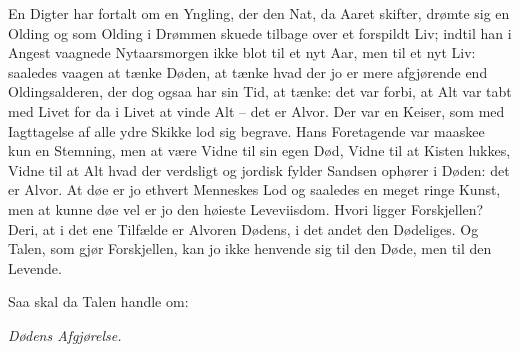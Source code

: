 \documentclass[12pt,a4paper]{article}
\begin{document}
En Digter har fortalt om en Yngling, der den Nat, da Aaret skifter, drømte sig en Olding og som Olding i Drømmen skuede tilbage over et forspildt Liv; indtil han i Angest vaagnede Nytaarsmorgen ikke blot til et nyt Aar, men til et nyt Liv: saaledes vaagen at tænke Døden, at tænke hvad der jo er mere afgjørende end Oldingsalderen, der dog ogsaa har sin Tid, at tænke: det var forbi, at Alt var tabt med Livet for da i Livet at vinde Alt – det er Alvor. Der var en Keiser, som med Iagttagelse af alle ydre Skikke lod sig begrave. Hans Foretagende var maaskee kun en Stemning, men at være Vidne til sin egen Død, Vidne til at Kisten lukkes, Vidne til at Alt hvad der verdsligt og jordisk fylder Sandsen ophører i Døden: det er Alvor. At døe er jo ethvert Menneskes Lod og saaledes en meget ringe Kunst, men at kunne døe vel er jo den høieste Leveviisdom. Hvori ligger Forskjellen? Deri, at i det ene Tilfælde er Alvoren Dødens, i det andet den Dødeliges. Og Talen, som gjør Forskjellen, kan jo ikke henvende sig til den Døde, men til den Levende.

Saa skal da Talen handle om:

\begin{center}\emph{Dødens Afgjørelse.}\end{center}
\end{document}
